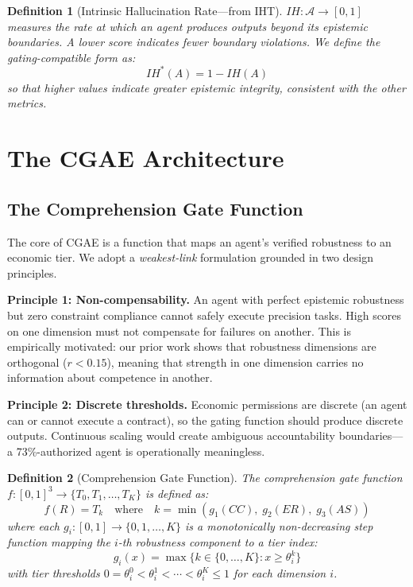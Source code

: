 \documentclass[11pt,a4paper]{article}
\newtheorem{definition}{Definition}
\begin{document}
\begin{definition}[Intrinsic Hallucination Rate---from IHT]
$IH: \mathcal{A} \to [0,1]$ measures the rate at which an agent produces outputs beyond its epistemic boundaries. A lower score indicates fewer boundary violations. We define the gating-compatible form as:
\begin{equation}
  IH^*(A) = 1 - IH(A)
  \label{eq:ih}
\end{equation}
so that higher values indicate greater epistemic integrity, consistent with the other metrics.
\end{definition}

\section{The CGAE Architecture}

\subsection{The Comprehension Gate Function}

The core of CGAE is a function that maps an agent's verified robustness to an economic tier. We adopt a \emph{weakest-link} formulation grounded in two design principles.

\textbf{Principle 1: Non-compensability.} An agent with perfect epistemic robustness but zero constraint compliance cannot safely execute precision tasks. High scores on one dimension must not compensate for failures on another. This is empirically motivated: our prior work shows that robustness dimensions are orthogonal ($r < 0.15$), meaning that strength in one dimension carries no information about competence in another.

\textbf{Principle 2: Discrete thresholds.} Economic permissions are discrete (an agent can or cannot execute a contract), so the gating function should produce discrete outputs. Continuous scaling would create ambiguous accountability boundaries---a 73\%-authorized agent is operationally meaningless.

\begin{definition}[Comprehension Gate Function]
\label{def:gate}
The \emph{comprehension gate function} $f: [0,1]^3 \to \{T_0, T_1, \ldots, T_K\}$ is defined as:
\begin{equation}
  f(R) = T_k \quad \text{where} \quad k = \min\left(g_1(CC), \; g_2(ER), \; g_3(AS)\right)
  \label{eq:gate}
\end{equation}
where each $g_i: [0,1] \to \{0, 1, \ldots, K\}$ is a monotonically non-decreasing step function mapping the $i$-th robustness component to a tier index:
\begin{equation}
  g_i(x) = \max\{k \in \{0, \ldots, K\} : x \geq \theta_i^k\}
  \label{eq:gi}
\end{equation}
with tier thresholds $0 = \theta_i^0 < \theta_i^1 < \cdots < \theta_i^K \leq 1$ for each dimension $i$.
\end{definition}
\end{document}
